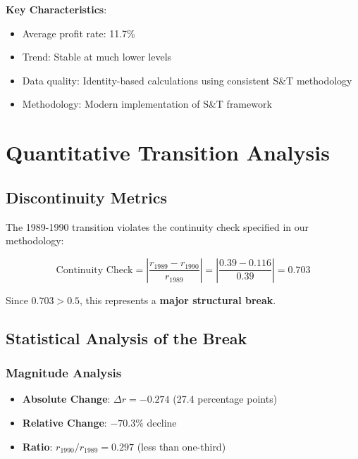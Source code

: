 \documentclass[12pt]{article}
\begin{document}
\textbf{Key Characteristics}:
\begin{itemize}
    \item Average profit rate: 11.7\%
    \item Trend: Stable at much lower levels
    \item Data quality: Identity-based calculations using consistent S\&T methodology
    \item Methodology: Modern implementation of S\&T framework
\end{itemize}

\section{Quantitative Transition Analysis}

\subsection{Discontinuity Metrics}

\begin{tcolorbox}[colback=red!5!white,colframe=red!75!black,title=Critical Discontinuity Detected]
The 1989-1990 transition violates the continuity check specified in our methodology:

\begin{equation}
\text{Continuity Check} = \left|\frac{r_{1989} - r_{1990}}{r_{1989}}\right| = \left|\frac{0.39 - 0.116}{0.39}\right| = 0.703
\end{equation}

Since $0.703 > 0.5$, this represents a \textbf{major structural break}.
\end{tcolorbox}

\subsection{Statistical Analysis of the Break}

\subsubsection{Magnitude Analysis}
\begin{itemize}
    \item \textbf{Absolute Change}: $\Delta r = -0.274$ (27.4 percentage points)
    \item \textbf{Relative Change}: $-70.3\%$ decline
    \item \textbf{Ratio}: $r_{1990}/r_{1989} = 0.297$ (less than one-third)
\end{itemize}
\end{document}
